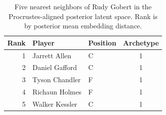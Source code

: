 \begin{table}[htbp]
  \centering\small
  \begin{tabular}{rllc}
    \toprule
    Rank & Player & Position & Archetype \\
    \midrule
    1 & Jarrett Allen & C & 1 \\
    2 & Daniel Gafford & C & 1 \\
    3 & Tyson Chandler & F & 1 \\
    4 & Richaun Holmes & F & 1 \\
    5 & Walker Kessler & C & 1 \\
    \bottomrule
  \end{tabular}
  \caption{Five nearest neighbors of Rudy Gobert in the Procrustes-aligned posterior latent space. Rank is by posterior mean embedding distance.}
  \label{tab:Rudy_Gobert_neighbors}
\end{table}

